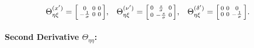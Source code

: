 \documentclass{article}
\begin{document}
%
\begin{align}
  \Theta_{\eta\xi}^{(x')}      & = \begin{bsmallmatrix} 0 & 0 & 0 \\ -\frac{1}{\sigma} & 0 & 0 \end{bsmallmatrix}, &
  \Theta_{\eta\xi}^{(\nu')}    & = \begin{bsmallmatrix} 0 & \frac{s}{\sigma} & 0 \\ 0 & -\frac{s}{\sigma} & 0 \end{bsmallmatrix}, &
  \Theta_{\eta\xi}^{(\delta')} & = \begin{bsmallmatrix} 0 & 0 & 0 \\ 0 & 0 & -\frac{1}{\sigma} \end{bsmallmatrix}.
\end{align}

\paragraph{Second Derivative $\Theta_{\eta\eta}$:}
\end{document}
